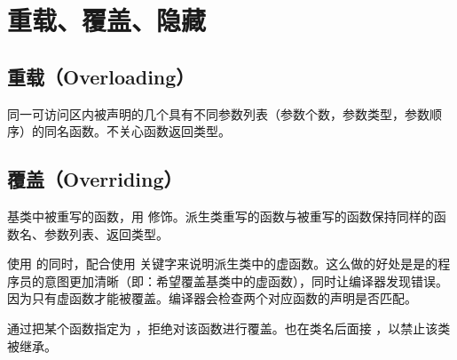 \documentclass[letterpaper,10pt,english]{sphinxmanual}
\begin{document}
\section{重载、覆盖、隐藏}
\label{\detokenize{cpp/08_overload::doc}}\label{\detokenize{cpp/08_overload:id1}}

\subsection{重载（Overloading）}
\label{\detokenize{cpp/08_overload:overloading}}
同一可访问区内被声明的几个具有不同参数列表（参数个数，参数类型，参数顺序）的同名函数。不关心函数返回类型。


\subsection{覆盖（Overriding）}
\label{\detokenize{cpp/08_overload:overriding}}
基类中被重写的函数，用  修饰。派生类重写的函数与被重写的函数保持同样的函数名、参数列表、返回类型。

使用  的同时，配合使用  关键字来说明派生类中的虚函数。这么做的好处是是的程序员的意图更加清晰（即：希望覆盖基类中的虚函数），同时让编译器发现错误。
因为只有虚函数才能被覆盖。编译器会检查两个对应函数的声明是否匹配。

通过把某个函数指定为  ，拒绝对该函数进行覆盖。也在类名后面接  ，以禁止该类被继承。
\end{document}
